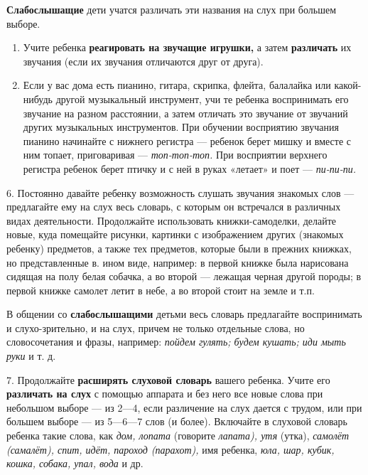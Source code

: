 \documentclass{book}
\renewcommand{\emph}[1]{\textit{#1}}
\begin{document}
\textbf{Слабослышащие} дети учатся различать эти названия на слух при
большем выборе.


\begin{enumerate}
\def\labelenumi{\arabic{enumi}.}
\setcounter{enumi}{3}
\item
  
  Учите ребенка \textbf{реагировать на звучащие игрушки,} а затем
  \textbf{различать} их звучания (если их звучания отличаются друг от
  друга).
  
\item
  
  Если у вас дома есть пианино, гитара, скрипка, флейта, балалайка или
  какой-нибудь другой музыкальный инструмент, учи те ребенка
  воспринимать его звучание на разном расстоянии, а затем отличать это
  звучание от звучаний других музыкальных инструментов. При обучении
  восприятию звучания пианино начинайте с нижнего регистра --- ребенок
  берет мишку и вместе с ним топает, приговаривая ---
  \emph{топ-топ-топ.} При восприятии верхнего регистра ребенок берет
  птичку и с ней в руках «летает» и поет --- \emph{пи-пи-пи.}
  
\end{enumerate}


6. Постоянно давайте ребенку возможность слушать звучания знакомых слов
--- предлагайте ему на слух весь словарь, с которым он встречался в
различных видах деятельности. Продолжайте использовать книжки-самоделки,
делайте новые, куда помещайте рисунки, картинки с изображением других
(знакомых ребенку) предметов, а также тех предметов, которые были в
прежних книжках, но представленные в. ином виде, например: в первой
книжке была нарисована сидящая на полу белая собачка, а во второй ---
лежащая черная другой породы; в первой книжке самолет летит в небе, а во
второй стоит на земле и т.п.

В общении со \textbf{слабослышащими} детьми весь словарь предлагайте
воспринимать и слухо-зрительно, и на слух, причем не только отдельные
слова, но словосочетания и фразы, например: \emph{пойдем гулять; будем
кушать; иди мыть руки} и т. д.

7. Продолжайте \textbf{расширять слуховой словарь} вашего ребенка. Учите
его \textbf{различать на слух} с помощью аппарата и без него все новые
слова при небольшом выборе --- из 2---4, если различение на слух дается
с трудом, или при большем выборе --- из 5---6---7 слов (и более).
Включайте в слуховой словарь ребенка такие слова, как \emph{дом, лопата}
(говорите \emph{лапата), утя} (утка), \emph{самолёт (самалёт), спит,
идёт, пароход (парахот),} имя ребенка, \emph{юла, шар, кубик, кошка,
собака, упал, вода} и др.
\end{document}
